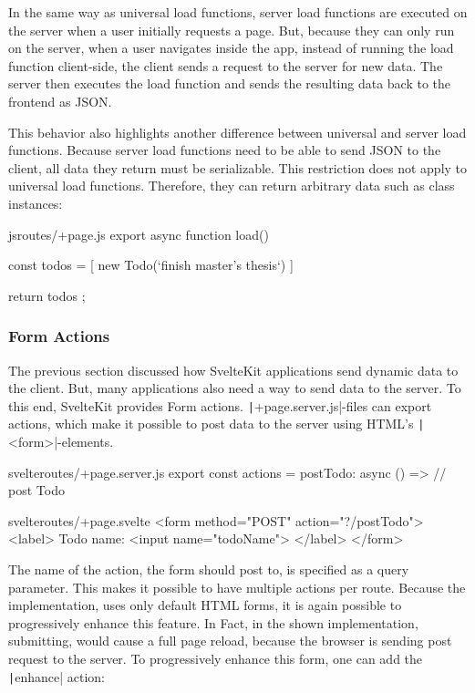 In the same way as universal load functions, server load functions are executed on the server when a user initially requests a page. But, because they can only run on the server, when a user navigates inside the app, instead of running the load function client-side, the client sends a request to the server for new data. The server then executes the load function and sends the resulting data back to the frontend as JSON.

This behavior also highlights another difference between universal and server load functions. Because server load functions need to be able to send JSON to the client, all data they return must be serializable. This restriction does not apply to universal load functions. Therefore, they can return arbitrary data such as class instances:

\begin{myminted}{js}{routes/+page.js}
    export async function load() {
            const todos =  [ new Todo(`finish master's thesis`) ]

            return { todos };
        }
\end{myminted}

\subsubsection{Form Actions}
\label{sec:sveltekit-server-actions}

The previous section discussed how SvelteKit applications send dynamic data to the client. But, many applications also need a way to send data to the server. To this end, SvelteKit provides Form actions. \texttt|+page.server.js|-files can export actions, which make it possible to post data to the server using HTML's \texttt|<form>|-elements.

\begin{myminted}{svelte}{routes/+page.server.js}
    export const actions = {
    postTodo: async () => {
    // post Todo
    }
    }
\end{myminted}
\begin{myminted}{svelte}{routes/+page.svelte}
    <form method="POST" action="?/postTodo">
    <label>
    Todo name:
    <input name="todoName">
    </label>
    </form>
\end{myminted}

The name of the action, the form should post to, is specified as a query parameter. This makes it possible to have multiple actions per route. Because the implementation, uses only default HTML forms, it is again possible to progressively enhance this feature. In Fact, in the shown implementation, submitting, would cause a full page reload, because the browser is sending post request to the server. To progressively enhance this form, one can add the \texttt|enhance| action:

